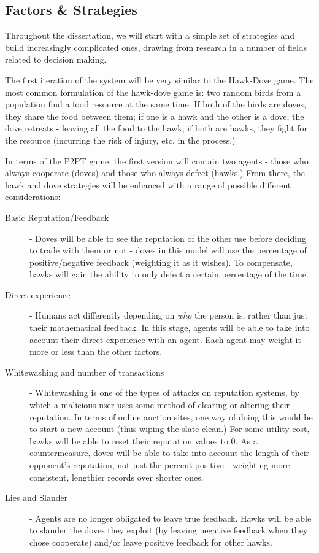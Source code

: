 \documentclass{article}
\begin{document}
\subsection{Factors \& Strategies}
\label{sec:factors-strategies}
Throughout the dissertation, we will start with a simple set of strategies and build increasingly complicated ones, drawing from research in a number of fields related to decision making.

The first iteration of the system will be very similar to the Hawk-Dove game\cite{smith1973lhe}. The most common formulation of the hawk-dove game is: two random birds from a population find a food resource at the same time. If both of the birds are doves, they share the food between them; if one is a hawk and the other is a dove, the dove retreats - leaving all the food to the hawk; if both are hawks, they fight for the resource (incurring the risk of injury, etc, in the process.)

In terms of the P2PT game, the first version will contain two agents - those who always cooperate (doves) and those who always defect (hawks.) From there, the hawk and dove strategies will be enhanced with a range of possible different considerations:
\begin{description}
	\item[Basic Reputation/Feedback] - Doves will be able to see the reputation of the other use before deciding to trade with them or not - doves in this model will use the percentage of positive/negative feedback (weighting it as it wishes). To compensate, hawks will gain the ability to only defect a certain percentage of the time.
	\item[Direct experience] - Humans act differently depending on \emph{who} the person is\cite{fehr2003nature}, rather than just their mathematical feedback. In this stage, agents will be able to take into account their direct experience with an agent. Each agent may weight it more or less than the other factors.
	\item[Whitewashing and number of transactions] - Whitewashing\cite{hoffman2009survey} is one of the types of attacks on reputation systems, by which a malicious user uses some method of clearing or altering their reputation. In terms of online auction sites, one way of doing this would be to start a new account (thus wiping the slate clean.) For some utility cost, hawks will be able to reset their reputation values to 0. As a countermeasure, doves will be able to take into account the length of their opponent's reputation, not just the percent positive - weighting more consistent, lengthier records over shorter ones.
	\item[Lies and Slander] - Agents are no longer obligated to leave true feedback. Hawks will be able to slander\cite{hoffman2009survey} the doves they exploit (by leaving negative feedback when they chose cooperate) and/or leave positive feedback for other hawks.
\end{description}
\end{document}
